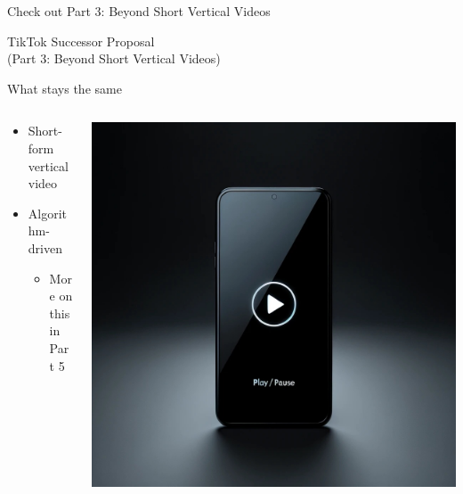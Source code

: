 \documentclass[aspectratio=169]{beamer}
\begin{document}
\begin{frame}{Check out Part 3: Beyond Short Vertical Videos}
\end{frame}

\begin{frame}
    \centering
    \Huge TikTok Successor Proposal \\
    \Huge (Part 3: Beyond Short Vertical Videos)
\end{frame}

\begin{frame}{What stays the same}
\begin{columns}[T]
    \begin{column}[T]{0.5\textwidth}
        \begin{itemize}
            \item Short-form vertical video
            \item Algorithm-driven
            \begin{itemize}
                \item More on this in Part 5
            \end{itemize}
        \end{itemize}
    \end{column}
    \begin{column}{0.5\textwidth}
        \includegraphics[height=0.8\textheight]{imgs/media/vertical_vid.jpeg}
    \end{column}
\end{columns}
\end{frame}
\end{document}
